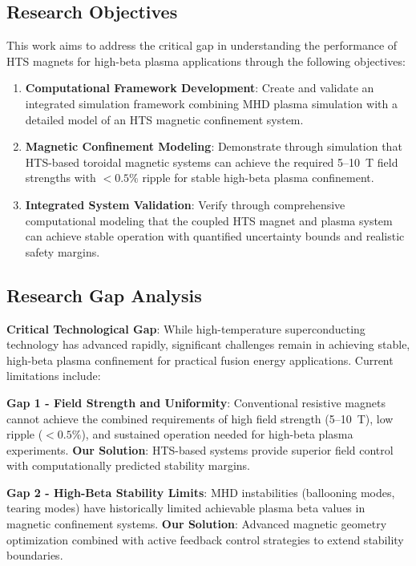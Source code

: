 \documentclass[10pt,twocolumn]{article}
\begin{document}
\subsection{Research Objectives}

This work aims to address the critical gap in understanding the performance of HTS magnets for high-beta plasma applications through the following objectives:

\begin{enumerate}
\item \textbf{Computational Framework Development}: Create and validate an integrated simulation framework combining MHD plasma simulation with a detailed model of an HTS magnetic confinement system.

\item \textbf{Magnetic Confinement Modeling}: Demonstrate through simulation that HTS-based toroidal magnetic systems can achieve the required 5--10~T field strengths with $<0.5\%$ ripple for stable high-beta plasma confinement.

\item \textbf{Integrated System Validation}: Verify through comprehensive computational modeling that the coupled HTS magnet and plasma system can achieve stable operation with quantified uncertainty bounds and realistic safety margins.
\end{enumerate}

\subsection{Research Gap Analysis}

\textbf{Critical Technological Gap}: While high-temperature superconducting technology has advanced rapidly, significant challenges remain in achieving stable, high-beta plasma confinement for practical fusion energy applications. Current limitations include:

\textbf{Gap 1 - Field Strength and Uniformity}: Conventional resistive magnets cannot achieve the combined requirements of high field strength (5--10~T), low ripple ($<0.5\%$), and sustained operation needed for high-beta plasma experiments. \textbf{Our Solution}: HTS-based systems provide superior field control with computationally predicted stability margins.

\textbf{Gap 2 - High-Beta Stability Limits}: MHD instabilities (ballooning modes, tearing modes) have historically limited achievable plasma beta values in magnetic confinement systems. \textbf{Our Solution}: Advanced magnetic geometry optimization combined with active feedback control strategies to extend stability boundaries.
\end{document}

